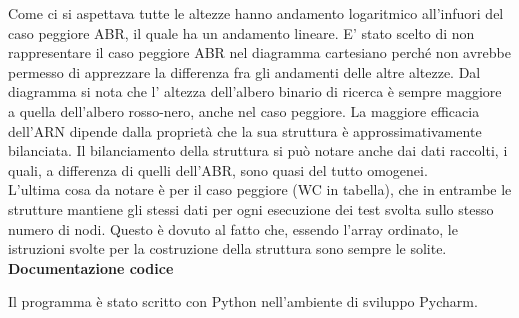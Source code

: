 \documentclass[a4paper, 11pt]{article}
\begin{document}
\newpage
\begin{center}
\begin{figure}
\centering
{}
\end{figure}
\end{center}

\vspace{1,5 cm}
Come ci si aspettava tutte le altezze hanno andamento logaritmico all'infuori del caso peggiore ABR, il quale ha un andamento lineare. E' stato scelto di non rappresentare il caso peggiore ABR nel diagramma cartesiano perché non avrebbe permesso di apprezzare la differenza fra gli andamenti delle altre altezze. Dal diagramma si nota che l' altezza dell'albero binario di ricerca è sempre maggiore a quella dell'albero rosso-nero, anche nel caso peggiore. La maggiore efficacia dell'ARN dipende dalla proprietà che la sua struttura è approssimativamente bilanciata. Il bilanciamento della struttura si può notare anche dai dati raccolti, i quali, a differenza di quelli dell'ABR, sono quasi del tutto omogenei.\\
L'ultima cosa da notare è per il caso peggiore (WC in tabella), che in entrambe le strutture mantiene gli stessi dati per ogni esecuzione dei test svolta sullo stesso numero di nodi. Questo è dovuto al fatto che, essendo l'array ordinato, le istruzioni svolte per la costruzione della struttura sono sempre le solite.
\newpage
\textbf{Documentazione codice}

\vspace{0,7 cm}
Il programma è stato scritto con Python nell'ambiente di sviluppo Pycharm.
\end{document}
